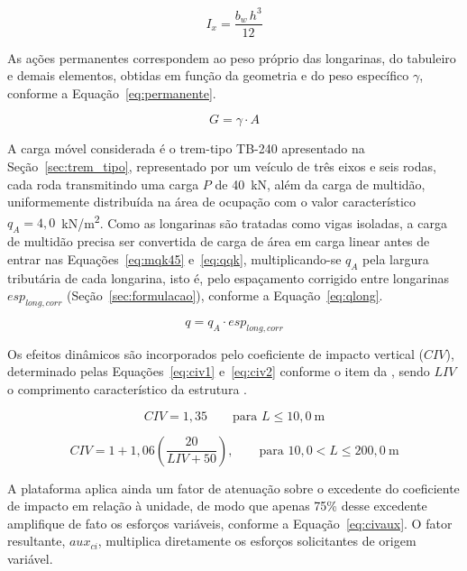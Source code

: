 \begin{equation}
I_x = \frac{b_w\,h^3}{12}
\label{eq:iret}
\end{equation}

As ações permanentes correspondem ao peso próprio das longarinas, do tabuleiro e demais elementos, obtidas em função da geometria e do peso específico $\gamma$, conforme a Equação~\eqref{eq:permanente}.

\begin{equation}
G = \gamma \cdot A
\label{eq:permanente}
\end{equation}

A carga móvel considerada é o trem-tipo TB-240 apresentado na Seção~\ref{sec:trem_tipo}, representado por um veículo de três eixos e seis rodas, cada roda transmitindo uma carga $P$ de 40~kN, além da carga de multidão, uniformemente distribuída na área de ocupação com o valor característico $q_A = 4{,}0$~kN/m\textsuperscript{2}.
Como as longarinas são tratadas como vigas isoladas, a carga de multidão precisa ser convertida de carga de área em carga linear antes de entrar nas Equações~\eqref{eq:mqk45} e~\eqref{eq:qqk}, multiplicando-se $q_A$ pela largura tributária de cada longarina, isto é, pelo espaçamento corrigido entre longarinas $esp_{long,corr}$ (Seção~\ref{sec:formulacao}), conforme a Equação~\eqref{eq:qlong}.

\begin{equation}
q = q_A \cdot esp_{long,corr}
\label{eq:qlong}
\end{equation}

Os efeitos dinâmicos são incorporados pelo coeficiente de impacto vertical ($CIV$), determinado pelas Equações~\eqref{eq:civ1} e~\eqref{eq:civ2} conforme o item  da \textcite{nbr7188}, sendo $LIV$ o comprimento característico da estrutura .

\begin{equation}
CIV = 1{,}35 \qquad \text{para } L \leq 10{,}0\ \text{m}
\label{eq:civ1}
\end{equation}

\begin{equation}
CIV = 1 + 1{,}06\left(\frac{20}{LIV + 50}\right), \qquad \text{para } 10{,}0 < L \leq 200{,}0\ \text{m}
\label{eq:civ2}
\end{equation}

A plataforma aplica ainda um fator de atenuação sobre o excedente do coeficiente de impacto em relação à unidade, de modo que apenas 75\% desse excedente amplifique de fato os esforços variáveis, conforme a Equação~\eqref{eq:civaux}.
O fator resultante, $aux_{ci}$, multiplica diretamente os esforços solicitantes de origem variável.

